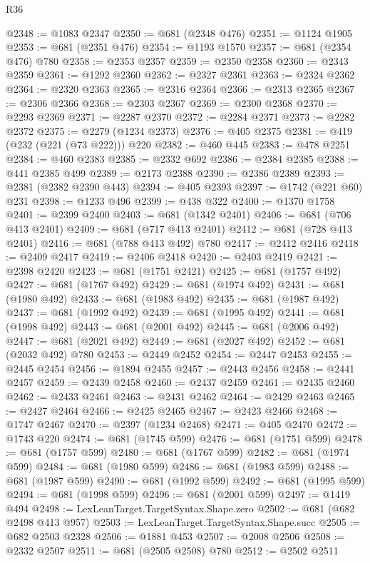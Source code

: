 \begin{lexlean}{R36}
\begin{coremodule}
@2348 := @1083 @2347
@2350 := @681 (@2348 @476)
@2351 := @1124 @1905
@2353 := @681 (@2351 @476)
@2354 := @1193 @1570
@2357 := @681 (@2354 @476) @780
@2358 := @2353 @2357
@2359 := @2350 @2358
@2360 := @2343 @2359
@2361 := @1292 @2360
@2362 := @2327 @2361
@2363 := @2324 @2362
@2364 := @2320 @2363
@2365 := @2316 @2364
@2366 := @2313 @2365
@2367 := @2306 @2366
@2368 := @2303 @2367
@2369 := @2300 @2368
@2370 := @2293 @2369
@2371 := @2287 @2370
@2372 := @2284 @2371
@2373 := @2282 @2372
@2375 := @2279 (@1234 @2373)
@2376 := @405 @2375
@2381 := @419 (@232 (@221 (@73 @222))) @220
@2382 := @460 @445
@2383 := @478 @2251
@2384 := @460 @2383
@2385 := @2332 @692
@2386 := @2384 @2385
@2388 := @441 @2385 @499
@2389 := @2173 @2388
@2390 := @2386 @2389
@2393 := @2381 (@2382 @2390 @443)
@2394 := @405 @2393
@2397 := @1742 (@221 @60) @231
@2398 := @1233 @496
@2399 := @438 @322
@2400 := @1370 @1758
@2401 := @2399 @2400
@2403 := @681 (@1342 @2401)
@2406 := @681 (@706 @413 @2401)
@2409 := @681 (@717 @413 @2401)
@2412 := @681 (@728 @413 @2401)
@2416 := @681 (@788 @413 @492) @780
@2417 := @2412 @2416
@2418 := @2409 @2417
@2419 := @2406 @2418
@2420 := @2403 @2419
@2421 := @2398 @2420
@2423 := @681 (@1751 @2421)
@2425 := @681 (@1757 @492)
@2427 := @681 (@1767 @492)
@2429 := @681 (@1974 @492)
@2431 := @681 (@1980 @492)
@2433 := @681 (@1983 @492)
@2435 := @681 (@1987 @492)
@2437 := @681 (@1992 @492)
@2439 := @681 (@1995 @492)
@2441 := @681 (@1998 @492)
@2443 := @681 (@2001 @492)
@2445 := @681 (@2006 @492)
@2447 := @681 (@2021 @492)
@2449 := @681 (@2027 @492)
@2452 := @681 (@2032 @492) @780
@2453 := @2449 @2452
@2454 := @2447 @2453
@2455 := @2445 @2454
@2456 := @1894 @2455
@2457 := @2443 @2456
@2458 := @2441 @2457
@2459 := @2439 @2458
@2460 := @2437 @2459
@2461 := @2435 @2460
@2462 := @2433 @2461
@2463 := @2431 @2462
@2464 := @2429 @2463
@2465 := @2427 @2464
@2466 := @2425 @2465
@2467 := @2423 @2466
@2468 := @1747 @2467
@2470 := @2397 (@1234 @2468)
@2471 := @405 @2470
@2472 := @1743 @220
@2474 := @681 (@1745 @599)
@2476 := @681 (@1751 @599)
@2478 := @681 (@1757 @599)
@2480 := @681 (@1767 @599)
@2482 := @681 (@1974 @599)
@2484 := @681 (@1980 @599)
@2486 := @681 (@1983 @599)
@2488 := @681 (@1987 @599)
@2490 := @681 (@1992 @599)
@2492 := @681 (@1995 @599)
@2494 := @681 (@1998 @599)
@2496 := @681 (@2001 @599)
@2497 := @1419 @494
@2498 := LexLeanTarget.TargetSyntax.Shape.zero
@2502 := @681 (@682 @2498 @413 @957)
@2503 := LexLeanTarget.TargetSyntax.Shape.succ
@2505 := @682 @2503 @2328
@2506 := @1881 @453
@2507 := @2008 @2506
@2508 := @2332 @2507
@2511 := @681 (@2505 @2508) @780
@2512 := @2502 @2511

\end{coremodule}
\end{lexlean}

